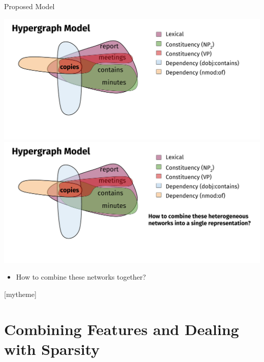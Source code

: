 \documentclass[10pt,=table]{beamer}
\begin{document}
\begin{frame}{Proposed Model}
\begin{overprint}
	\includegraphics[width=1\linewidth]{image2/Chapitre2/hyper_network_ex_5.pdf}%
	\onslide<7>\includegraphics[width=1\linewidth]{image2/Chapitre2/hyper_network_ex_6.pdf}%
	
	\begin{itemize}
	\item[] How to combine these networks together?
	\end{itemize}
	\end{overprint}
	\vspace{7cm}
\end{frame}


[mytheme]
\section[Contributions in Detail]{Combining Features and Dealing with Sparsity}                  
\end{document}
